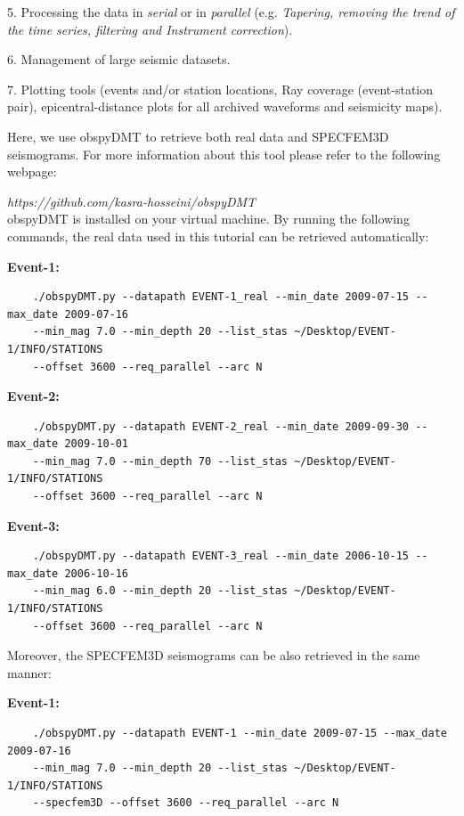 \documentclass{article}
\begin{document}
5. Processing the data in \textit{serial} or in \textit{parallel} (e.g. \textit{Tapering, 
removing the trend of the time series, filtering and Instrument correction}).

6. Management of large seismic datasets.

7. Plotting tools (events and/or station locations, Ray coverage (event-station 
pair), epicentral-distance plots for all archived waveforms and seismicity maps).

\vspace{13pt}
Here, we use obspyDMT to retrieve both real data and SPECFEM3D seismograms. For 
more information about this tool please refer to the following webpage:

{\color{color18} \emph{https://github.com/kasra-hosseini/obspyDMT}}  \\

obspyDMT is installed on your virtual machine. By running the following commands, 
the real data used in this tutorial can be retrieved automatically:

\textbf{Event-1:}

\begin{verbatim}
    ./obspyDMT.py --datapath EVENT-1_real --min_date 2009-07-15 --max_date 2009-07-16 
    --min_mag 7.0 --min_depth 20 --list_stas ~/Desktop/EVENT-1/INFO/STATIONS 
    --offset 3600 --req_parallel --arc N
\end{verbatim}

\textbf{Event-2:}

\begin{verbatim}
    ./obspyDMT.py --datapath EVENT-2_real --min_date 2009-09-30 --max_date 2009-10-01 
    --min_mag 7.0 --min_depth 70 --list_stas ~/Desktop/EVENT-1/INFO/STATIONS 
    --offset 3600 --req_parallel --arc N
\end{verbatim}

\textbf{Event-3:}

\begin{verbatim}
    ./obspyDMT.py --datapath EVENT-3_real --min_date 2006-10-15 --max_date 2006-10-16 
    --min_mag 6.0 --min_depth 20 --list_stas ~/Desktop/EVENT-1/INFO/STATIONS 
    --offset 3600 --req_parallel --arc N
\end{verbatim}

Moreover, the SPECFEM3D seismograms can be also retrieved in the same manner:

\textbf{Event-1:}

\begin{verbatim}
    ./obspyDMT.py --datapath EVENT-1 --min_date 2009-07-15 --max_date 2009-07-16 
    --min_mag 7.0 --min_depth 20 --list_stas ~/Desktop/EVENT-1/INFO/STATIONS 
    --specfem3D --offset 3600 --req_parallel --arc N
\end{verbatim}
\end{document}
